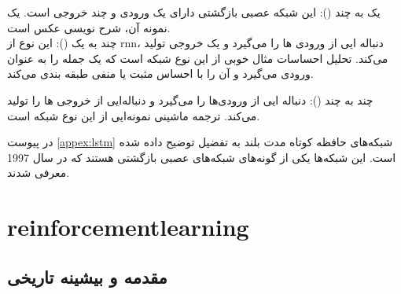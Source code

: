 % 
 یک به چند (): این شبکه عصبی بازگشتی دارای یک ورودی و چند خروجی است. یک نمونه آن، شرح نویسی عکس است.
\\

 چند به یک (): این نوع از \gls{rnn}، دنباله ایی از ورودی ها را می‌گیرد و یک خروجی تولید می‌کند. تحلیل احساسات مثال خوبی از این نوع شبکه است که یک جمله را به عنوان ورودی می‌گیرد و آن را با احساس مثبت یا منفی طبقه بندی می‌کند.

%
 
 چند به چند (): دنباله ایی از ورودی‌ها را می‌گیرد و دنباله‌ایی از خروجی ها را تولید می‌کند. ترجمه ماشینی نمونه‌ایی از این نوع شبکه است.

در پیوست \ref{appex:lstm} شبکه‌های حافظه کوتاه مدت بلند به تفضیل توضیح داده شده است. این شبکه‌ها یکی از گونه‌های شبکه‌های عصبی بازگشتی هستند که در سال 1997 معرفی شدند.

 \section{\gls{reinforcementlearning}}
 
 \subsection{مقدمه و بیشینه تاریخی}
 
